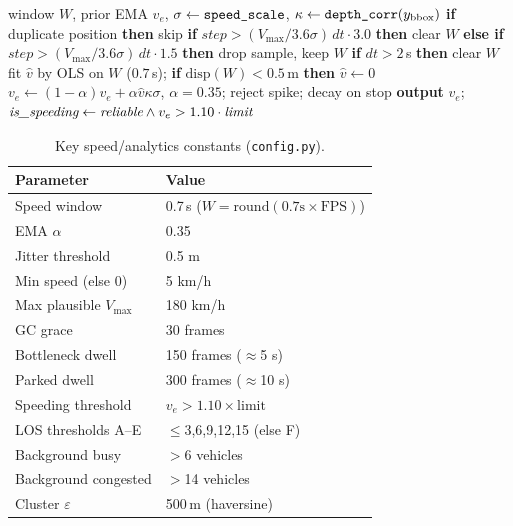 \documentclass[conference]{IEEEtran}
\renewcommand{\_}{\textunderscore\allowbreak}
\begin{document}
\begin{algorithm}[t]
\caption{Per-track speed estimation (\texttt{analytics.\_speed})}
\label{alg:speed}
\begin{algorithmic}[1]
\Require window $W$, prior EMA $v_e$, $\sigma \gets \texttt{speed\_scale}$, $\kappa \gets \texttt{depth\_corr}(y_\text{bbox})$
\State \textbf{if} duplicate position \textbf{then} skip 
\State \textbf{if} $\textit{step} > (V_{\max}/3.6\sigma)\,dt\cdot 3.0$ \textbf{then} clear $W$ 
\State \textbf{else if} $\textit{step} > (V_{\max}/3.6\sigma)\,dt\cdot 1.5$ \textbf{then} drop sample, keep $W$ 
\State \textbf{if} $dt > 2$\,s \textbf{then} clear $W$ 
\State fit $\hat{v}$ by OLS on $W$ ($0.7$\,s); \textbf{if} $\mathrm{disp}(W){<}0.5$\,m \textbf{then} $\hat{v}\gets 0$ 
\State $v_e \gets (1{-}\alpha)v_e + \alpha\hat{v}\kappa\sigma$, $\alpha{=}0.35$; reject spike; decay on stop 
\State \textbf{output} $v_e$;\quad $\textit{is\_speeding} \gets \textit{reliable} \land v_e > 1.10\cdot\textit{limit}$ 
\end{algorithmic}
\end{algorithm}

\begin{table}[t]
\caption{Key speed/analytics constants (\texttt{config.py}).}
\label{tab:const}
\centering
\small
\begin{tabular}{@{}ll@{}}
\toprule
Parameter & Value \\
\midrule
Speed window & 0.7\,s ($W{=}\mathrm{round}(0.7\text{s}{\times}\text{FPS})$) \\
EMA $\alpha$ & 0.35 \\
Jitter threshold & 0.5 m \\
Min speed (else 0) & 5 km/h \\
Max plausible $V_{\max}$ & 180 km/h \\
GC grace & 30 frames \\
Bottleneck dwell & 150 frames ($\approx$5 s) \\
Parked dwell & 300 frames ($\approx$10 s) \\
Speeding threshold & $v_e > 1.10\times\text{limit}$ \\
LOS thresholds A--E & $\le$3,6,9,12,15 (else F) \\
Background busy & ${>}$6 vehicles \\
Background congested & ${>}$14 vehicles \\
Cluster $\varepsilon$ & 500\,m (haversine) \\
\bottomrule
\end{tabular}
\end{table}
\end{document}
